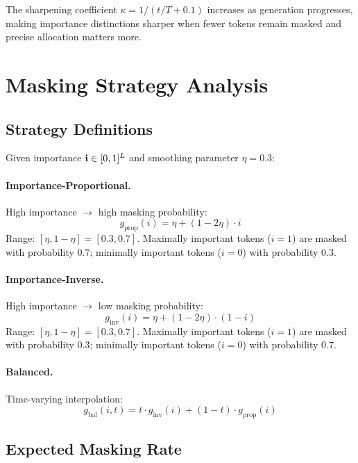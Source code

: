 The sharpening coefficient $\kappa = 1/(t/T + 0.1)$ increases as generation progresses, making importance distinctions sharper when fewer tokens remain masked and precise allocation matters more.

\section{Masking Strategy Analysis}
\label{app:masking}

\subsection{Strategy Definitions}

Given importance $\mathbf{i} \in [0,1]^L$ and smoothing parameter $\eta = 0.3$:

\paragraph{Importance-Proportional.} High importance $\to$ high masking probability:
\begin{equation}
    g_{\text{prop}}(i) = \eta + (1{-}2\eta) \cdot i
\end{equation}
Range: $[\eta, 1{-}\eta] = [0.3, 0.7]$. Maximally important tokens ($i=1$) are masked with probability $0.7$; minimally important tokens ($i=0$) with probability $0.3$.

\paragraph{Importance-Inverse.} High importance $\to$ low masking probability:
\begin{equation}
    g_{\text{inv}}(i) = \eta + (1{-}2\eta) \cdot (1{-}i)
\end{equation}
Range: $[\eta, 1{-}\eta] = [0.3, 0.7]$. Maximally important tokens ($i=1$) are masked with probability $0.3$; minimally important tokens ($i=0$) with probability $0.7$.

\paragraph{Balanced.} Time-varying interpolation:
\begin{equation}
    g_{\text{bal}}(i, t) = t \cdot g_{\text{inv}}(i) + (1{-}t) \cdot g_{\text{prop}}(i)
\end{equation}

\subsection{Expected Masking Rate}

